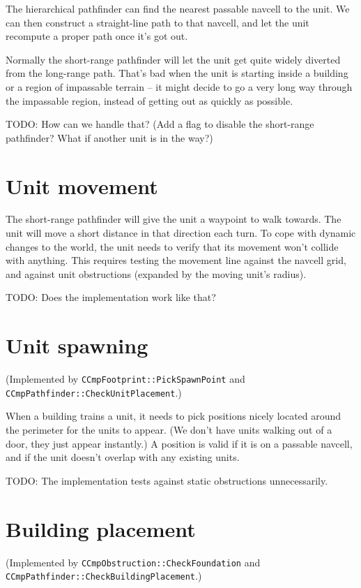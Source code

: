 \documentclass[a4paper,10pt]{article}
\begin{document}
The hierarchical pathfinder can find the nearest passable navcell to the unit.
We can then construct a straight-line path to that navcell,
and let the unit recompute a proper path once it's got out.

Normally the short-range pathfinder will let the unit get quite widely diverted from the long-range path.
That's bad when the unit is starting inside a building or a region of impassable terrain --
it might decide to go a very long way through the impassable region,
instead of getting out as quickly as possible.

TODO: How can we handle that? (Add a flag to disable the short-range pathfinder?
What if another unit is in the way?)

\section{Unit movement}

The short-range pathfinder will give the unit a waypoint to walk towards.
The unit will move a short distance in that direction each turn.
To cope with dynamic changes to the world,
the unit needs to verify that its movement won't collide with anything.
This requires testing the movement line against the navcell grid,
and against unit obstructions (expanded by the moving unit's radius).

TODO: Does the implementation work like that?

\section{Unit spawning}

(Implemented by \texttt{CCmpFootprint::PickSpawnPoint}
and \texttt{CCmpPathfinder::CheckUnitPlacement}.)

When a building trains a unit, it needs to pick positions nicely located
around the perimeter for the units to appear.
(We don't have units walking out of a door, they just appear instantly.)
A position is valid if it is on a passable navcell,
and if the unit doesn't overlap with any existing units.

TODO: The implementation tests against static obstructions unnecessarily.

\section{Building placement}

(Implemented by \texttt{CCmpObstruction::CheckFoundation}
and \texttt{CCmpPathfinder::CheckBuildingPlacement}.)
\end{document}
